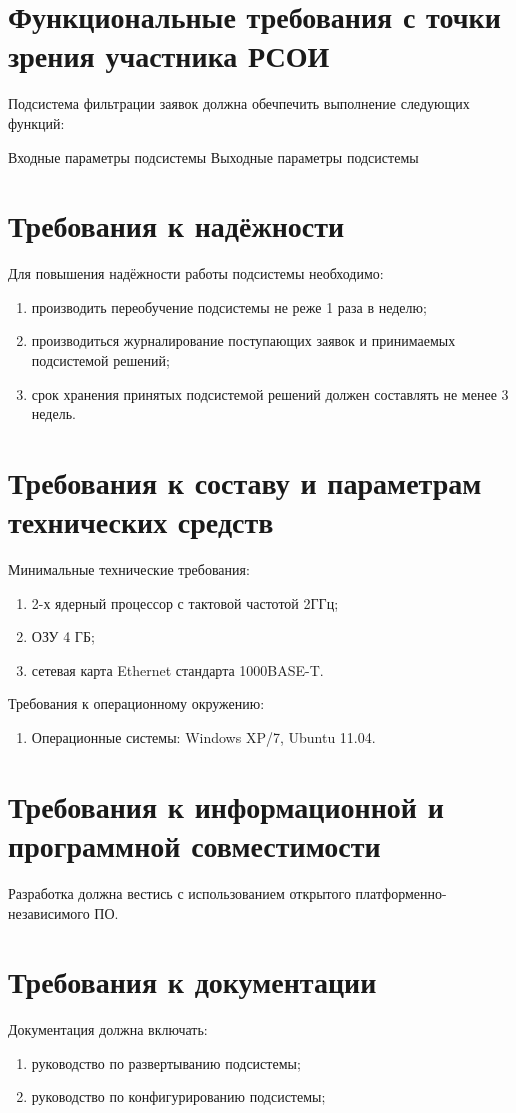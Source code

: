 \documentclass[utf8x, 12pt]{G7-32}
\begin{document}
\section{Функциональные требования с точки зрения участника РСОИ}

Подсистема фильтрации заявок должна обечпечить выполнение следующих функций:

Входные параметры подсистемы
Выходные параметры подсистемы

\section{Требования к надёжности}

Для повышения надёжности работы подсистемы необходимо:
\begin{enumerate}
        \item производить переобучение подсистемы не реже 1 раза в неделю;
        \item производиться журналирование поступающих заявок и принимаемых 
        подсистемой решений;
        \item срок хранения принятых подсистемой решений должен составлять не менее
        3 недель.
\end{enumerate}

\section{Требования к составу и параметрам технических средств}

Минимальные технические требования:
\begin{enumerate}
        \item 2-х ядерный процессор с тактовой частотой 2ГГц;
        \item ОЗУ 4 ГБ;
        \item сетевая карта Ethernet стандарта 1000BASE-T.
\end{enumerate}

Требования к операционному окружению:
\begin{enumerate}
        \item Операционные системы: Windows XP/7, Ubuntu 11.04.
\end{enumerate}

\section{Требования к информационной и программной совместимости}
Разработка должна вестись с использованием открытого платформенно-независимого ПО.

\section{Требования к документации}

Документация должна включать:
\begin{enumerate}
        \item руководство по развертыванию подсистемы;
        \item руководство по конфигурированию подсистемы;
\end{enumerate}

\backmatter

%
%
\end{document}
